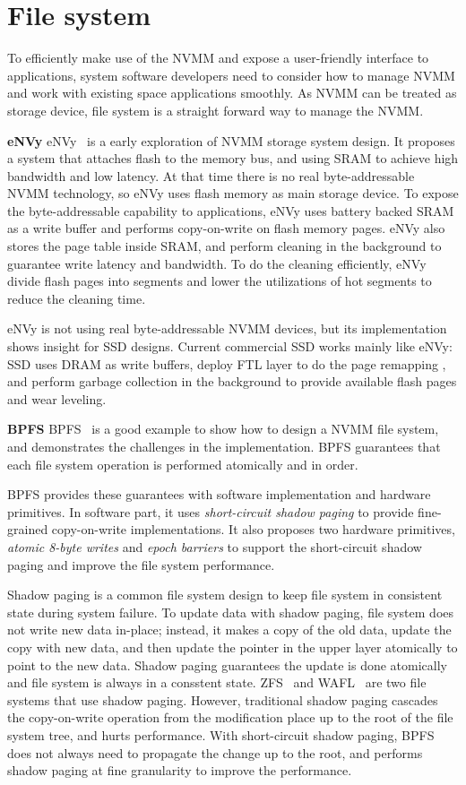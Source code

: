 \section{File system} 
\label{sec:fs}

To efficiently make use of the NVMM and expose a user-friendly
interface to applications, system software developers need to consider
how to manage NVMM and work with existing space applications smoothly.
As NVMM can be treated as storage device, file system is a straight forward
way to manage the NVMM.

\textbf{eNVy} eNVy~\cite{eNVy} is a early exploration of NVMM storage system
design. It proposes a system that attaches flash to the memory
bus, and using SRAM to achieve high bandwidth and low latency. At that time
there is no real byte-addressable NVMM technology, so eNVy uses flash memory
as main storage device. To expose the byte-addressable capability to 
applications, eNVy uses battery backed SRAM as a write buffer and performs
copy-on-write on flash memory pages. eNVy also stores the page table inside
SRAM, and perform cleaning in the background to guarantee write latency and
bandwidth. To do the cleaning efficiently, eNVy divide flash pages into
segments and lower the utilizations of hot segments to reduce the cleaning
time.

eNVy is not using real byte-addressable NVMM devices, but its implementation
shows insight for SSD designs. Current commercial SSD works mainly like
eNVy: SSD uses DRAM as write buffers, deploy FTL layer to do the page remapping
, and perform garbage collection in the background to provide available flash
pages and wear leveling.


\textbf{BPFS} BPFS~\cite{BPFS} is a good example to show how to design a NVMM
file system, and demonstrates the challenges in the implementation.
BPFS guarantees that
each file system operation is performed atomically and in order.

BPFS provides these guarantees with software implementation and hardware
primitives. In software part, it uses \emph{short-circuit shadow paging}
to provide fine-grained copy-on-write implementations. It also proposes
two hardware primitives, \emph{atomic 8-byte writes} and \emph{epoch barriers}
to support the short-circuit shadow paging and improve the file system
performance.

Shadow paging is a common file system design to keep file system in consistent
state during system failure. To update data with shadow paging, file system
does not write new data in-place; instead, it makes a copy of the old data,
update the copy with new data, and then update the pointer in the upper layer
atomically to point to the new data. Shadow paging guarantees the update is done
atomically and file system is always in a consstent state.
 ZFS~\cite{zfs} and WAFL~\cite{wafl} are two file
systems that use shadow paging. However, traditional shadow paging cascades
the copy-on-write operation from the modification place up to the root of 
the file system tree, and hurts performance. With short-circuit shadow paging,
BPFS does not always need to propagate the change up to the root, and performs
shadow paging at fine granularity to improve the performance.

